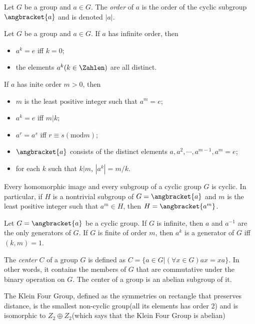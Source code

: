\begin{Definition}
	Let $ G $ be a group and $ a \in G $. The \textit{order} of $ a $ is the order of the cyclic subgroup $ \angbracket{a} $ and is denoted $ |a| $.
\end{Definition}
\begin{Theorem}
	Let $ G $ be a group and $ a \in G $. If $ a $ has infinite order, then
	\begin{itemize}
		\item $ a^k=e $ iff $ k=0 $;
		\item the elements $ a^k (k \in \Zahlen) $ are all distinct.
	\end{itemize}
If $ a $ has inite order $ m>0 $, then
\begin{itemize}
	\item $ m $ is the least positive integer such that $ a^m=e $;
	\item $ a^k=e $ iff $ m|k $;
	\item $ a^r = a^s $ iff $ r \equiv s(\text{mod} m) $;
	\item $ \angbracket{a} $ consists of the distinct elements $ a,a^2,\cdots,a^{m-1},a^m=e $;
	\item for each $ k $ such that $ k|m $, $ |a^k| = m/k $.
\end{itemize}
\end{Theorem}
\begin{Theorem}
	Every homomorphic image and every subgroup of a cyclic group $ G $ is cyclic. In particular, if $ H $ is a nontrivial subgroup of $ G = \angbracket{a} $ and $ m $ is the least positive integer such that $ a^m \in H $, then $ H = \angbracket{a^m} $.
\end{Theorem}
\begin{Theorem}
	Let $ G = \angbracket{a} $ be a cyclic group. If $ G $ is infinite, then $ a $ and $ a^{-1} $ are the only generators of $ G $. If $ G $ is finite of order $ m $, then $ a^k $ is a generator of $ G $ iff $ (k,m)=1 $.
\end{Theorem}
\begin{Definition}
	The \textit{center} $ C $ of a group $ G $ is defined as $ C=\{a \in G |(\forall x \in G)ax=xa \} $. In other words, it contains the members of $ G $ that are commutative under the binary operation on $ G $. The center of a group is an abelian subgroup of it.
\end{Definition}
\begin{Definition}
	The Klein Four Group, defined as the symmetries on rectangle that preserves distance, is the smallest non-cyclic group(all its elements has order $ 2 $) and is isomorphic to $ Z_2 \oplus Z_2 $(which says that the Klein Four Group is abelian)
\end{Definition}

